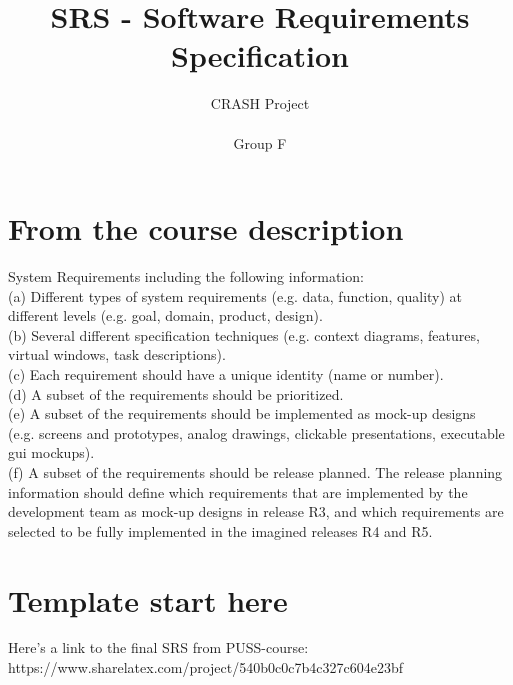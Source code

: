 \documentclass[10pt]{article}
\title{SRS - Software Requirements Specification}
\author{CRASH Project
\\
\\ Group F}
\date{}
\begin{document}

\begin{titlepage}
\clearpage
  \maketitle
\thispagestyle{empty}

\end{titlepage}


\tableofcontents
\thispagestyle{empty}
\newpage
{}


\section{From the course description}
\sloppy
\noindent
System Requirements including the following information:
\\(a) Different types of system requirements (e.g. data, function, quality) at
different levels (e.g. goal, domain, product, design).
\\(b) Several different specification techniques (e.g. context diagrams, features,
virtual windows, task descriptions).
\\(c) Each requirement should have a unique identity (name or number).
\\(d) A subset of the requirements should be prioritized.
\\(e) A subset of the requirements should be implemented as mock-up designs
\\(e.g. screens and prototypes, analog drawings, clickable presentations,
executable gui mockups).
\\(f) A subset of the requirements should be release planned. The release
planning information should define which requirements that are implemented
by the development team as mock-up designs in release R3,
and which requirements are selected to be fully implemented in the
imagined releases R4 and R5.
\newline
\section{Template start here}
Here's a link to the final SRS from PUSS-course:
\\https://www.sharelatex.com/project/540b0c0c7b4c327c604e23bf
\newpage
\end{document}
